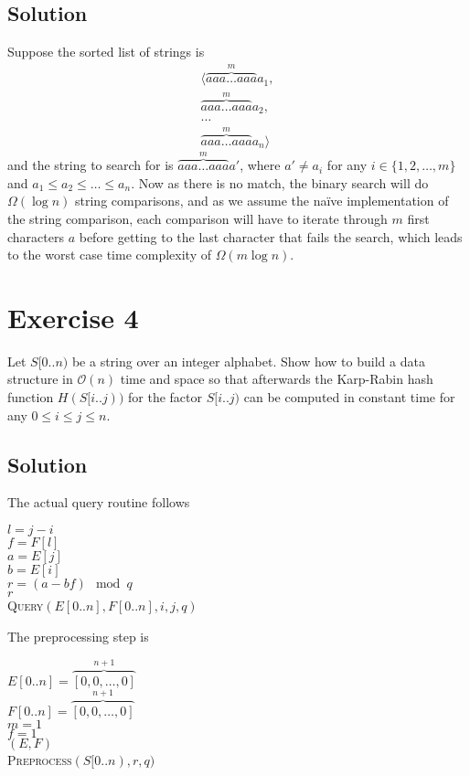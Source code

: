 \documentclass[10pt]{article}
\begin{document}
\subsection*{Solution}
Suppose the sorted list of strings is 
\begin{align*}
\langle \overbrace{aaa \dots aaa}^{m}a_1, \\
\overbrace{aaa \dots aaa}^{m}a_2, \\
\dots \\
\overbrace{aaa \dots aaa}^{m}a_n \rangle
\end{align*}
and the string to search for is $\overbrace{aaa \dots aaa}^{m}a'$, where $a' \neq a_i$ for any $i \in \{ 1, 2, \dots, m \}$ and $a_1 \leq  a_2 \leq \dots \leq a_n$. Now as there is no match, the binary search will do $\Omega(\log n)$ string comparisons, and as we assume the naïve implementation of the string comparison, each comparison will have to iterate through $m$ first characters $a$ before getting to the last character that fails the search, which leads to the worst case time complexity of $\Omega(m \log n)$.

\section*{Exercise 4}
\color{blue}
Let $S[0..n)$ be a string over an integer alphabet. Show how to build a data structure in $\mathcal{O}(n)$ time and space so that afterwards the Karp-Rabin hash function $H(S[i..j))$ for the factor $S[i..j)$ can be computed in constant time for any $0 \leq i \leq j \leq n$.
\color{black}

\subsection*{Solution}
The actual query routine follows
\begin{algorithm}
$l = j - i$ \\
$f = F[l]$ \\
$a = E[j]$ \\
$b = E[i]$ \\
$r = (a - bf) \mod q$ \\
\KwRet $r$ \\
\caption{\textsc{Query}$(E[0..n], F[0..n], i, j, q)$}
\end{algorithm}
The preprocessing step is
\begin{algorithm}
$E[0..n] = \overbrace{[0, 0, \dots, 0]}^{n + 1}$ \\
$F[0..n] = \overbrace{[0, 0, \dots, 0]}^{n + 1}$ \\
$m = 1$ \\
$f = 1$ \\
\KwRet $(E, F)$ \\
\caption{\textsc{Preprocess}$(S[0..n), r, q)$}
\end{algorithm}
\end{document}
